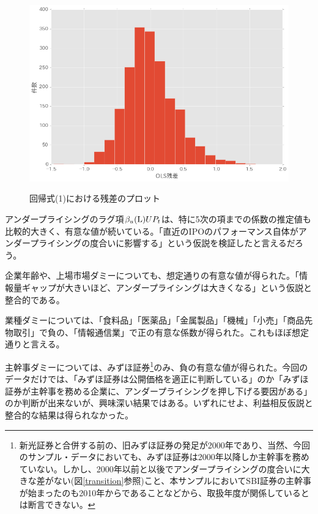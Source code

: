 \documentclass{jsarticle}
\begin{document}
\begin{figure}[!h]
  \begin{center}
  \caption{回帰式(1)における残差のプロット}
    \includegraphics[clip,width=14cm]{./residual.png}
    \label{residual}
  \end{center}
\end{figure}
\par
アンダープライシングのラグ項$\beta_u({\rm L})UP_t$は、特に5次の項までの係数の推定値も比較的大きく、有意な値が続いている。「直近のIPOのパフォーマンス自体がアンダープライシングの度合いに影響する」という仮説を検証したと言えるだろう。\par
企業年齢や、上場市場ダミーについても、想定通りの有意な値が得られた。「情報量ギャップが大きいほど、アンダープライシングは大きくなる」という仮説と整合的である。\par
業種ダミーについては、「食料品」「医薬品」「金属製品」「機械」「小売」「商品先物取引」で負の、「情報通信業」で正の有意な係数が得られた。これもほぼ想定通りと言える。\par
主幹事ダミーについては、みずほ証券\footnote[14]{新光証券と合併する前の、旧みずほ証券の発足が2000年であり、当然、今回のサンプル・データにおいても、みずほ証券は2000年以降しか主幹事を務めていない。しかし、2000年以前と以後でアンダープライシングの度合いに大きな差がない(図\ref{transition}参照)こと、本サンプルにおいてSBI証券の主幹事が始まったのも2010年からであることなどから、取扱年度が関係しているとは断言できない。}のみ、負の有意な値が得られた。今回のデータだけでは、「みずほ証券は公開価格を適正に判断している」のか「みずほ証券が主幹事を務める企業に、アンダープライシングを押し下げる要因がある」のか判断が出来ないが、興味深い結果ではある。いずれにせよ、利益相反仮説と整合的な結果は得られなかった。\par
\end{document}
